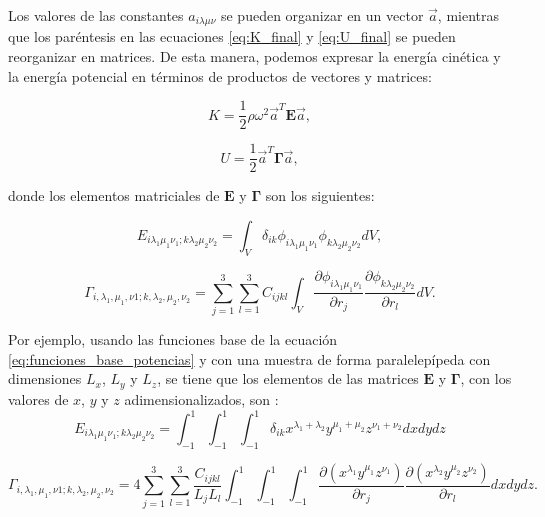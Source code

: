 \documentclass[12pt]{article}
\begin{document}
Los valores de las constantes $a_{i \lambda \mu \nu}$ se pueden organizar en un vector $\vec{a}$, mientras que los paréntesis en las ecuaciones \ref{eq:K_final} y \ref{eq:U_final} se pueden reorganizar en matrices. De esta manera, podemos expresar la energía cinética y la energía potencial en términos de productos de vectores y matrices: 

\begin{equation}
	K = \frac{1}{2} \rho \omega^2 \vec{a}^{T}\bm{E}\vec{a},
	\label{eq:K_matrix}
\end{equation}

\begin{equation}
	U = \frac{1}{2} \vec{a}^{T}\bm{\Gamma}\vec{a},
\end{equation}

donde los elementos matriciales de $\bm{E}$ y $\bm{\Gamma}$ son los siguientes:

\begin{equation}
	E_{i \lambda_1 \mu_1 \nu_1; k \lambda_2 \mu_2 \nu_2} = \int_{V}{\delta_{ik} \phi_{i \lambda_1 \mu_1 \nu_1}  \phi_{k \lambda_2 \mu_2 \nu_2} dV},
	\label{eq:matriz_E}
\end{equation}

\begin{equation}
    \Gamma_{i, \lambda_1, \mu_1,  \nu1; k, \lambda_2, \mu_2, \nu_2} = \sum_{j=1}^{3} \sum_{l=1}^{3} {C_{ijkl} \int_{V}{\frac{\partial \phi_{i \lambda_{1} \mu_1 \nu_1}}{\partial r_j} \frac{\partial \phi_{k \lambda_2 \mu_2 \nu_2}}{\partial r_l} dV}}.
	\label{eq:matriz_gamma}
\end{equation}

Por ejemplo, usando las funciones base de la ecuación \ref{eq:funciones_base_potencias} y con una muestra de forma paralelepípeda con dimensiones $L_x$, $L_y$ y $L_z$, se tiene que los elementos de las matrices $\bm{E}$ y $\bm{\Gamma}$, con los valores de $x$, $y$ y $z$ adimensionalizados, son \cite{Ohno}:
\begin{equation}
	E_{i \lambda_1 \mu_1 \nu_1; k \lambda_2 \mu_2 \nu_2} = \int_{-1}^{1} \int_{-1}^{1} \int_{-1}^{1} {\delta_{ik} x^{\lambda_1 + \lambda_2} y^{\mu_1 + \mu_2} z^{\nu_1 + \nu_2} dx dy dz}
	\label{eq:matriz_E_paralelepípedo_pot}
\end{equation}

\begin{equation}
    \Gamma_{i, \lambda_1, \mu_1,  \nu1; k, \lambda_2, \mu_2, \nu_2} = 4\sum_{j=1}^{3} \sum_{l=1}^{3} \frac{C_{ijkl}}{L_j L_l} \int_{-1}^{1} \int_{-1}^{1} \int_{-1}^{1} {\frac{\partial (x^{\lambda_1} y^{\mu_1} z^{\nu_1})}{\partial r_j} \frac{\partial (x^{\lambda_2} y^{\mu_2} z^{\nu_2})}{\partial r_l} dx dy dz}.
	\label{eq:matriz_gamma_paralelepípedo_pot}
\end{equation}
\end{document}
